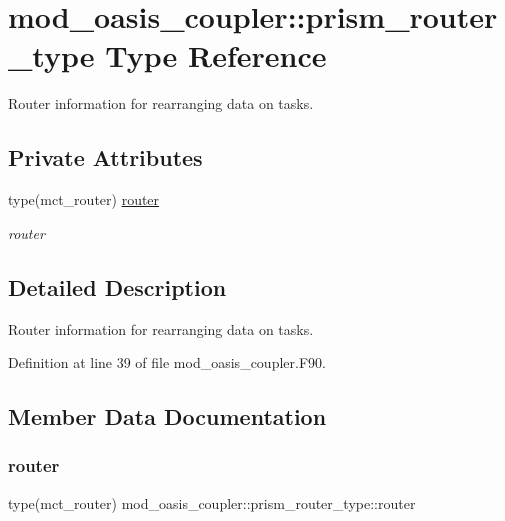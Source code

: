 \hypertarget{structmod__oasis__coupler_1_1prism__router__type}{}\section{mod\+\_\+oasis\+\_\+coupler\+:\+:prism\+\_\+router\+\_\+type Type Reference}
\label{structmod__oasis__coupler_1_1prism__router__type}


Router information for rearranging data on tasks.  


\subsection*{Private Attributes}
\begin{DoxyCompactItemize}
\item 
type(mct\+\_\+router) \hyperlink{structmod__oasis__coupler_1_1prism__router__type_aa898a44729c7578ab3b30f0826025f45}{router}
\begin{DoxyCompactList}\small\item\em router \end{DoxyCompactList}\end{DoxyCompactItemize}


\subsection{Detailed Description}
Router information for rearranging data on tasks. 

Definition at line 39 of file mod\+\_\+oasis\+\_\+coupler.\+F90.



\subsection{Member Data Documentation}
\mbox{\label{structmod__oasis__coupler_1_1prism__router__type_aa898a44729c7578ab3b30f0826025f45}} 
\subsubsection{\texorpdfstring{router}{router}}
{\footnotesize\ttfamily type(mct\+\_\+router) mod\+\_\+oasis\+\_\+coupler\+::prism\+\_\+router\+\_\+type\+::router\hspace{0.3cm}{\ttfamily [private]}}



